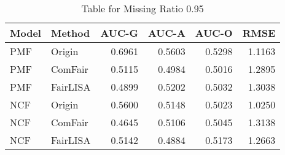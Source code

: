 \begin{table}
\centering
\caption{Table for Missing Ratio 0.95}
\label{tab:missing_0.95}
\begin{tabular}{llrrrr}
\toprule
Model &   Method &  AUC-G &  AUC-A &  AUC-O &   RMSE \\
\midrule
  PMF &   Origin & 0.6961 & 0.5603 & 0.5298 & 1.1163 \\
  PMF &  ComFair & 0.5115 & 0.4984 & 0.5016 & 1.2895 \\
  PMF & FairLISA & 0.4899 & 0.5202 & 0.5032 & 1.3038 \\
  NCF &   Origin & 0.5600 & 0.5148 & 0.5023 & 1.0250 \\
  NCF &  ComFair & 0.4645 & 0.5106 & 0.5045 & 1.3138 \\
  NCF & FairLISA & 0.5142 & 0.4884 & 0.5173 & 1.2663 \\
\bottomrule
\end{tabular}
\end{table}
